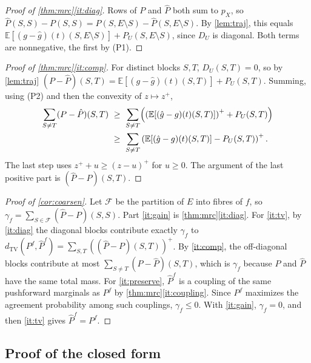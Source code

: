 \documentclass[11pt]{article}
\theoremstyle{definition}
\newcommand{\pX}{p_X}
\newcommand{\hP}{\hat P}
\newcommand{\TV}{d_{\mathrm{TV}}}
\newcommand{\pos}[1]{\left(#1\right)^{+}}
\newcommand{\F}{\mathcal{F}}
\newcommand{\Ex}{\mathbb{E}}
\begin{document}
\begin{proof}[Proof of \cref{thm:mrc}\ref{it:diag}]
Rows of $P$ and $\hP$ both sum to $\pX$, so
$\hP(S,S)-P(S,S)=P(S,E\setminus S)-\hP(S,E\setminus S)$. By \cref{lem:traj},
this equals $\Ex[(g-\hat g)(t)(S,E\setminus S)]+P_U(S,E\setminus S)$, since $D_U$
is diagonal. Both terms are nonnegative, the first by (P1).
\end{proof}

\begin{proof}[Proof of \cref{thm:mrc}\ref{it:comp}]
For distinct blocks $S,T$, $D_U(S,T)=0$, so by \cref{lem:traj}
$(P-\hP)(S,T)=\Ex[(g-\hat g)(t)(S,T)]+P_U(S,T)$. Summing, using (P2) and then the
convexity of $z\mapsto z^+$,
\begin{align*}
  \sum_{S\ne T}(P-\hP)(S,T)&\ \ge\ \sum_{S\neq T}\Bigl(\pos{\Ex[(\hat g-g)(t)(S,T)]}+P_U(S,T)\Bigr)\\
  &\ \ge\ \sum_{S\neq T}\pos{\Ex[(\hat g-g)(t)(S,T)]-P_U(S,T)}.
\end{align*}
The last step uses $z^++u\ge(z-u)^+$ for $u\ge0$. The argument of the last
positive part is $(\hP-P)(S,T)$.
\end{proof}

\begin{proof}[Proof of \cref{cor:coarsen}]
Let $\F$ be the partition of $E$ into fibres of $f$, so
$\gamma_f=\sum_{S\in\F}(\hP-P)(S,S)$. Part \ref{it:gain} is
\cref{thm:mrc}\ref{it:diag}. For \ref{it:tv}, by \ref{it:diag} the diagonal
blocks contribute exactly $\gamma_f$ to
$\TV(P^f,\hP^f)=\sum_{S,T}\pos{(\hP-P)(S,T)}$. By \ref{it:comp}, the
off-diagonal blocks contribute at most $\sum_{S\neq T}(P-\hP)(S,T)$, which is
$\gamma_f$ because $P$ and $\hP$ have the same total mass. For
\ref{it:preserve}, $\hP^f$ is a coupling of the same pushforward marginals as
$P^f$ by \cref{thm:mrc}\ref{it:coupling}. Since $P^f$ maximizes the agreement
probability among such couplings, $\gamma_f\le0$. With \ref{it:gain},
$\gamma_f=0$, and then \ref{it:tv} gives $\hP^f=P^f$.
\end{proof}

\subsection{Proof of the closed form}
\end{document}
